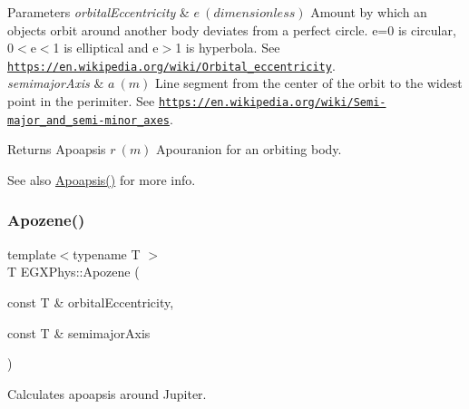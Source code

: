 \begin{DoxyParams}{Parameters}
{\em orbital\+Eccentricity} & $ e\ (dimensionless)$ Amount by which an objects orbit around another body deviates from a perfect circle. e=0 is circular, 0$<$e$<$1 is elliptical and e$>$1 is hyperbola. See \href{https://en.wikipedia.org/wiki/Orbital_eccentricity}{\tt https\+://en.\+wikipedia.\+org/wiki/\+Orbital\+\_\+eccentricity}. \\
\hline
{\em semimajor\+Axis} & $ a\ (m)$ Line segment from the center of the orbit to the widest point in the perimiter. See \href{https://en.wikipedia.org/wiki/Semi-major_and_semi-minor_axes}{\tt https\+://en.\+wikipedia.\+org/wiki/\+Semi-\/major\+\_\+and\+\_\+semi-\/minor\+\_\+axes}. \\
\hline
\end{DoxyParams}
\begin{DoxyReturn}{Returns}
Apoapsis $ r\ (m)$ Apouranion for an orbiting body. 
\end{DoxyReturn}
\begin{DoxySeeAlso}{See also}
\mbox{\hyperlink{group___e_g_x_phys-_apoapsis_gaf962e650bf84a568458e8eb39b1c61ba}{Apoapsis()}} for more info. 
\end{DoxySeeAlso}
\mbox{\label{group___e_g_x_phys-_apoapsis_ga44d3dd8d8b350d053b25b7b1f1e15534}} 
\subsubsection{\texorpdfstring{Apozene()}{Apozene()}}
{\footnotesize\ttfamily template$<$typename T $>$ \\
T E\+G\+X\+Phys\+::\+Apozene (\begin{DoxyParamCaption}\item[{const T \&}]{orbital\+Eccentricity,  }\item[{const T \&}]{semimajor\+Axis }\end{DoxyParamCaption})}



Calculates apoapsis around Jupiter. 


